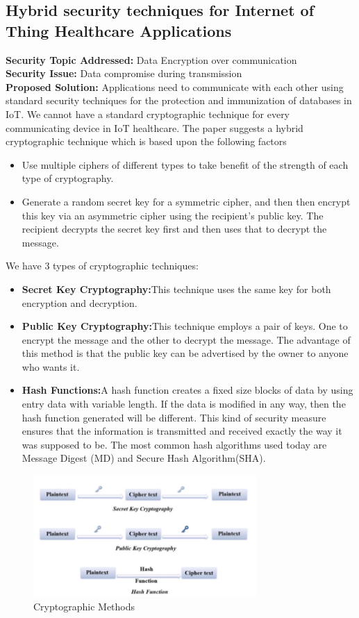 \documentclass[letterpaper, 10 pt, conference]{ieeeconf}  %
\begin{document}
\subsection{Hybrid security techniques for Internet of Thing Healthcare Applications\cite{three}}
\noindent \textbf{Security Topic Addressed:} Data Encryption over communication\\
\textbf{Security Issue:} Data compromise during transmission\\
\textbf{Proposed Solution:} 
Applications need to communicate with each other using standard security techniques for the protection and immunization of databases in IoT. We cannot have a standard cryptographic technique for every communicating device in IoT healthcare. The paper suggests a hybrid cryptographic technique which is based upon the following factors
\begin{itemize}
\item Use multiple ciphers of different types to take benefit of the strength of each type of cryptography.
\item Generate a random secret key for a symmetric cipher, and then then encrypt this key via an asymmetric cipher using the recipient's public key. The recipient decrypts the secret key first and then uses that to decrypt the message.
\end{itemize}
We have 3 types of cryptographic techniques:
\begin{itemize}
\item \textbf{Secret Key Cryptography:}This technique uses the same key for both encryption and decryption.
\item \textbf{Public Key Cryptography:}This technique employs a pair of keys. One to encrypt the message and the other to decrypt the message. The advantage of this method is that the public key can be advertised by the owner to anyone who wants it.
\item \textbf{Hash Functions:}A hash function creates a fixed size blocks of data by using entry data with variable length. If the data is modified in any way, then the hash function generated will be different. This kind of security measure ensures that the information is transmitted and received exactly the way it was supposed to be. The most common hash algorithms used today are Message Digest (MD) and Secure Hash Algorithm(SHA).
\end{itemize}
\begin{figure}[!ht]
\centering
\includegraphics[width= 8.5cm]{fig1.png}
\caption{Cryptographic Methods}
\end{figure}
\end{document}

